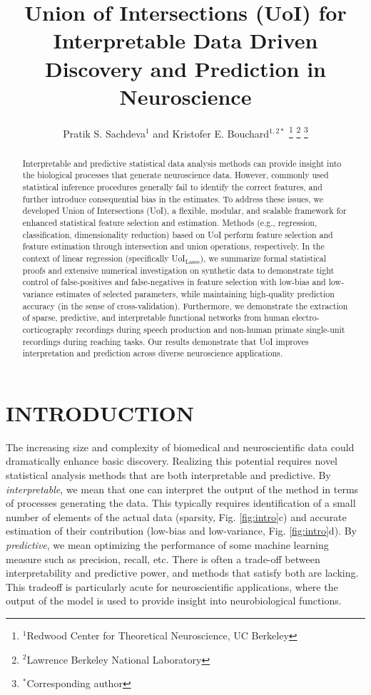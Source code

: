 \documentclass[letterpaper, 10 pt, conference]{ieeeconf}  %
\title{\LARGE \bf
Union of Intersections (UoI) for Interpretable Data Driven Discovery and Prediction in Neuroscience
}
\author{
    Pratik S. Sachdeva$^{1}$ and Kristofer E. Bouchard$^{1,2*}$%
    \thanks{
        $^{1}$Redwood Center for Theoretical Neuroscience, UC Berkeley
    }%
    \thanks{
        $^{2}$Lawrence Berkeley National Laboratory
    }%
    \thanks{
        $^*$Corresponding author
    }%
}
\begin{document}
\maketitle
\thispagestyle{empty}
\pagestyle{empty}


\begin{abstract}

Interpretable and predictive statistical data analysis methods can provide insight into the biological processes that generate neuroscience data.  However, commonly used statistical inference procedures generally fail to identify the correct features, and further introduce consequential bias in the estimates. To address these issues, we developed Union of Intersections (UoI), a flexible, modular, and scalable framework for enhanced statistical feature selection and estimation. Methods (e.g., regression, classification, dimensionality reduction) based on UoI perform feature selection and feature estimation through intersection and union operations, respectively. In the context of linear regression (specifically UoI$_{\text{Lasso}}$), we summarize formal statistical proofs and extensive numerical investigation on synthetic data to demonstrate tight control of false-positives and false-negatives in feature selection with low-bias and low-variance estimates of selected parameters, while maintaining high-quality prediction accuracy (in the sense of cross-validation). Furthermore, we demonstrate the extraction of sparse, predictive, and interpretable functional networks from human electro-corticography recordings during speech production and non-human primate single-unit recordings during reaching tasks. Our results demonstrate that UoI improves interpretation and prediction across diverse neuroscience applications. 

\end{abstract}


\section{INTRODUCTION}
The increasing size and complexity of biomedical and neuroscientific data could dramatically enhance basic discovery. Realizing this potential requires novel statistical analysis methods that are both interpretable and predictive. By \textit{interpretable}, we mean that one can interpret the output of the method in terms of processes generating the data. This typically requires identification of a small number of elements of the actual data (sparsity, Fig. \ref{fig:intro}c) and accurate estimation of their contribution (low-bias and low-variance, Fig. \ref{fig:intro}d). By \textit{predictive}, we mean optimizing the performance of some machine learning measure such as precision, recall, etc. There is often a trade-off between interpretability and predictive power, and methods that satisfy both are lacking. This tradeoff is particularly acute for neuroscientific applications, where the output of the model is used to provide insight into neurobiological functions. 
\end{document}
